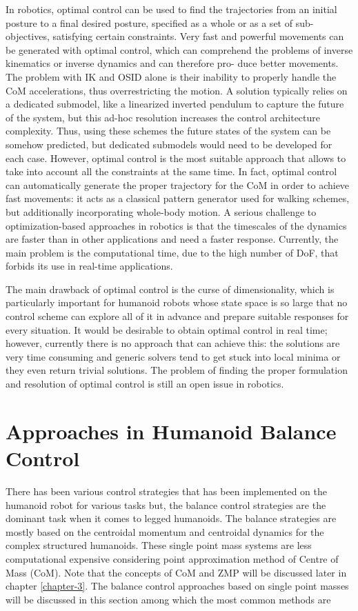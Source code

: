 In robotics, optimal control can be used to find the trajectories from an initial posture to a final desired posture, specified as a whole or as a set of sub-objectives, satisfying certain constraints.
Very fast and powerful movements can be generated with optimal control, which can comprehend the problems of inverse kinematics or inverse dynamics and can therefore pro- duce better movements. The 
problem with IK and OSID alone is their inability to properly handle the CoM accelerations, thus overrestricting the motion. A solution typically relies on a dedicated submodel, like a linearized 
inverted pendulum \cite{kajita2003biped} to capture the future of the system, but this ad-hoc resolution increases the control architecture complexity. Thus, using these schemes the future states of the system
can be somehow predicted, but dedicated submodels would need to be developed for each case. However, optimal control is the most suitable approach that allows to take into account all the constraints
at the same time. In fact, optimal control can automatically generate the proper trajectory for the CoM in order to achieve fast movements: it acts as a classical pattern generator used for walking
schemes, but additionally incorporating whole-body motion. A serious challenge to optimization-based approaches in robotics is that the timescales of the dynamics are faster than in other applications 
and need a faster response. Currently, the main problem is the computational time, due to the high number of DoF, that forbids its use in real-time applications.

The main drawback of optimal control is the curse of dimensionality, which is particularly important for humanoid robots whose state space is so large that no control scheme can explore all of it in advance and 
prepare suitable responses for every situation. It would be desirable to obtain optimal control in real time; however, currently there is no approach that can achieve this: the solutions are very time consuming 
and generic solvers tend to get stuck into local minima or they even return trivial solutions. The problem of finding the proper formulation and resolution of optimal control is still an open issue in robotics.

\section{Approaches in Humanoid Balance Control}


There has been various control strategies that has been implemented on the humanoid robot for various tasks but, the balance control strategies are the dominant task when it comes to legged humanoids. 
The balance strategies are mostly based on the centroidal momentum and centroidal dynamics for the complex structured humanoids. These single point mass systems are less computational expensive considering
point approximation method of Centre of Mass (CoM). Note that the concepts of CoM and ZMP will be discussed later in chapter \ref{chapter-3}. The balance control approaches based on single point masses will be discussed in this section among which the most common methods are

